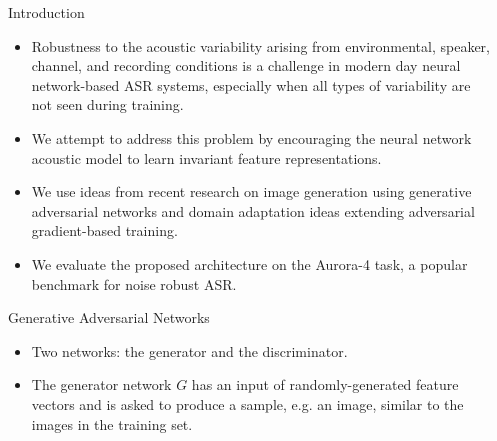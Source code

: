 \documentclass[final]{beamer}
\newlength{\sepwid}
\newlength{\onecolwid}
\begin{document}
\begin{frame}[t] %

\begin{columns}[t] %

\begin{column}{\sepwid}\end{column} %

\begin{column}{\onecolwid} %


\begin{block}{Introduction}
    \begin{itemize}
        \item 
            \textcolor{dblue}{Robustness} to the acoustic variability arising from environmental, speaker, channel, 
    and recording 
    conditions is a challenge in modern day 
    neural network-based ASR systems, especially when all types of variability are 
    not seen during training. 
    
        \item We attempt to address this problem by encouraging the 
            neural network acoustic model to learn \textcolor{dblue}{invariant} feature representations.
        
        \item We use ideas from recent research on image generation using
            \textcolor{dblue}{generative adversarial networks} and domain adaptation ideas extending
    adversarial gradient-based training.  
        \item We evaluate the proposed 
    architecture on the Aurora-4 task, a popular benchmark for
    noise robust ASR. 
    \end{itemize}

\end{block}



\begin{block}{Generative Adversarial Networks}
    \begin{itemize}
        \item Two networks: the generator and the discriminator.
        \item The generator network $G$ has an
    input of randomly-generated feature vectors and is asked to produce a sample, e.g. an image, 
    similar to the images in the training set. 
    

\end{itemize}
\end{block}
\end{column}
\end{columns}
\end{frame}
\end{document}
